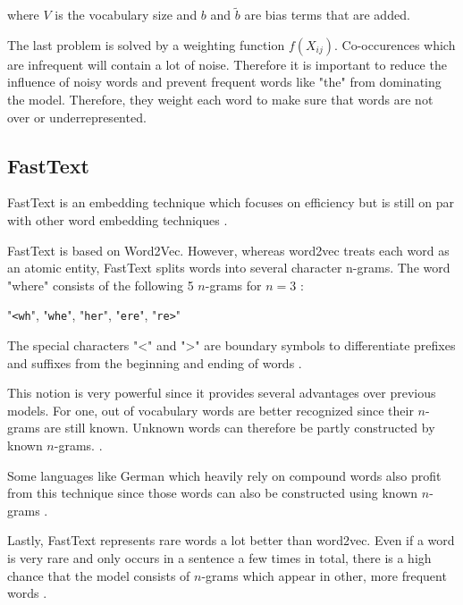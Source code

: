 where $V$ is the vocabulary size and $b$ and $\widetilde{b}$ are bias terms that are added.
\medskip

The last problem is solved by a weighting function $f(X_{ij})$. Co-occurences which are infrequent will contain a lot of noise. Therefore it is important to reduce the influence of noisy words and prevent frequent words like "the" from dominating the model. Therefore, they weight each word to make sure that words are not over or underrepresented.

\subsection{FastText}

FastText is an embedding technique which focuses on efficiency but is still on par with other word embedding techniques \cite{Joulin2016}.
\medskip

FastText is based on Word2Vec. However, whereas word2vec treats each word as an atomic entity, FastText splits words into several character n-grams. The word "where" consists of the following 5 $n$-grams for $n=3$ \cite{Bojanowski2017}: 

\begin{center}
	"\verb|<wh|", "\verb|whe|", "\verb|her|", "\verb|ere|", "\verb|re>|"
\end{center}

The special characters "<" and ">" are boundary symbols to differentiate prefixes and suffixes from the beginning and ending of words \cite{Bojanowski2017}.
\medskip

This notion is very powerful since it provides several advantages over previous models. For one, out of vocabulary words are better recognized since their $n$-grams are still known. Unknown words can therefore be partly constructed by known $n$-grams. \cite{Bojanowski2017}. 
\medskip

Some languages like German which heavily rely on compound words also profit from this technique since those words can also be constructed using known $n$-grams \cite{Bojanowski2017}.
\medskip

Lastly, FastText represents rare words a lot better than word2vec. Even if a word is very rare and only occurs in a sentence a few times in total, there is a high chance that the model consists of $n$-grams which appear in other, more frequent words \cite{Bojanowski2017}.

